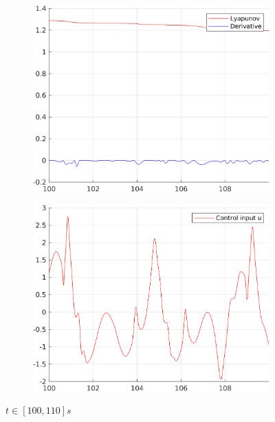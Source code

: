 \documentclass[12pt,a4paper]{article}
\begin{document}
\begin{figure}[H]
\begin{subfigure}{.45\textwidth}
			\includegraphics[width=1\textwidth]{Graphics/NonLinearLyapunov2.png}
		\end{subfigure}%
		\begin{subfigure}{.45\textwidth}
			\centering
			\includegraphics[width=1\textwidth]{Graphics/NonLinearControl2.png}
		\end{subfigure}
		\caption{$t \in [100,110]s$}
	\end{figure}
\end{document}

